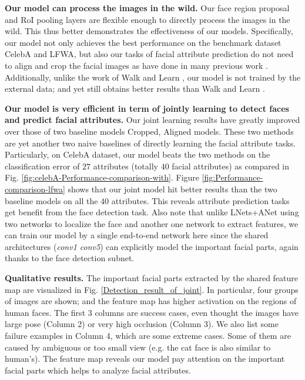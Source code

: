 \documentclass[10pt,twocolumn,letterpaper]{article}
\begin{document}
\vspace{0.05in}

\noindent \textbf{Our model can process the images in the wild. }Our face region proposal and RoI pooling layers are flexible
enough to directly process the images in the wild. This thus better
demonstrates the effectiveness of our models. Specifically, our model
not only achieves the best performance on the benchmark dataset \textendash{}
CelebA and LFWA, but also our tasks of facial attribute prediction
do not need to align and crop the facial images as have done in many
previous work \cite{rudd2016moon,kumar2008facetracer,liu2015deep}.
Additionally, unlike the work of Walk and Learn \cite{wang2016walk},
our model is not trained by the external data; and yet still obtains
better results than Walk and Learn \cite{wang2016walk}.

\vspace{0.05in}

\noindent \textbf{Our model is very efficient in term of jointly
learning to detect faces and predict facial attributes. }Our joint
learning results have greatly improved over those of two baseline
models \textendash{} Cropped, Aligned models. These two methods
are yet another two naive baselines of directly learning the facial
attribute tasks. Particularly, on CelebA dataset, our model beats
the two methods on the classification error of $27$ attributes
(totally $40$ facial attributes) as compared in Fig. \ref{fig:celebA-Performance-comparison-with}.
Figure \ref{fig:Performance-comparison-lfwa} shows that our joint
model hit better results than the two baseline models on all the $40$
attributes. This reveals attribute prediction tasks get benefit from
the face detection task. Also note that unlike LNets+ANet \cite{liu2015deep}
using two networks to localize the face and another one network to
extract features, we can train our model by a single end-to-end network
here since the shared architectures (\emph{conv1 \textendash{} conv5})
can explicitly model the important facial parts, again thanks to the
face detection subnet. 

\vspace{0.05in}

\noindent \textbf{Qualitative results. }The important facial parts
extracted by the shared feature map are visualized in Fig. \ref{Detection_result_of_joint}.
In particular, four groups of images are shown; and the feature map
has higher activation on the regions of human faces. The first 3 columns
are success cases, even thought the images have large pose (Column
2) or very high occlusion (Column 3). We also list some failure examples
in Column 4, which are some extreme cases. Some of them are caused
by ambiguous or too small view (e.g. the cat face is also similar
to human's). The feature map reveals our model pay attention on the
important facial parts which helps to analyze facial attributes.
\end{document}
